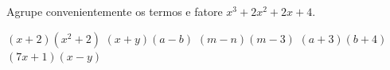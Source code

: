 Agrupe convenientemente os termos e fatore $x^3+2x^2+2x+4$.

$(x+2)(x^2+2)$
$(x+y)(a-b)$
$(m-n)(m-3)$
$(a+3)(b+4)$
$(7x+1)(x-y)$


